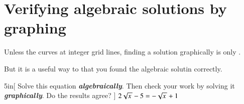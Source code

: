 \section{Verifying algebraic solutions by graphing}

\begin{myCenteredBox}[width=6in]
    Unless the curves   at integer grid lines,
    finding a solution graphically is only .

    \vspace{1em}
    But it is a useful way to  that you found the algebraic solutin correctly.
    \end{myCenteredBox}

\begin{myWideProblem}[\large]{5in}[%
        Solve this equation {\bfseries\itshape algebraically}. 
        Then check your work by solving it {\bfseries\itshape graphically}. 
        Do the results agree?
        ]
    {
        $ 2 \myRoot{x} - 5 = - \myRoot{x} + 1 $
    }
\end{myWideProblem}
